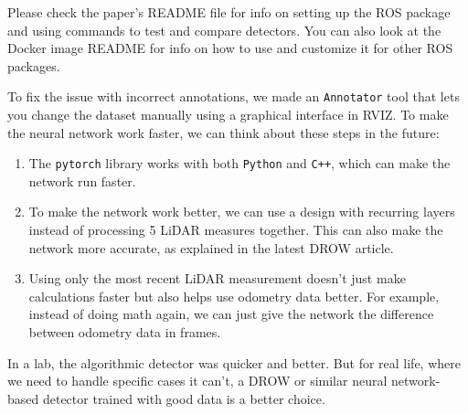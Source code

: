 \documentclass{article}
\begin{document}
Please check the paper's README file\cite{FTD_repo_readme} for info on setting up the ROS package and using commands to test and compare detectors.
You can also look at the Docker image README\cite{FTD_image_readme} for info on how to use and customize it for other ROS packages.

To fix the issue with incorrect annotations, we made an \texttt{Annotator} tool that lets you change the dataset manually using a graphical interface in RVIZ.
To make the neural network work faster, we can think about these steps in the future:
\begin{enumerate}
	\item The \texttt{pytorch} library works with both \texttt{Python} and \texttt{C++}, which can make the network run faster.
    \item To make the network work better, we can use a design with recurring layers instead of processing 5 LiDAR measures together. This can also make the network more accurate, as explained in the latest DROW article\cite{DROW_2018}.
	\item Using only the most recent LiDAR measurement doesn't just make calculations faster but also helps use odometry data better. For example, instead of doing math again, we can just give the network the difference between odometry data in frames.
\end{enumerate}

In a lab, the algorithmic detector was quicker and better.
But for real life, where we need to handle specific cases it can't, a DROW or similar neural network-based detector trained with good data is a better choice.

\clearpage



\end{document}
